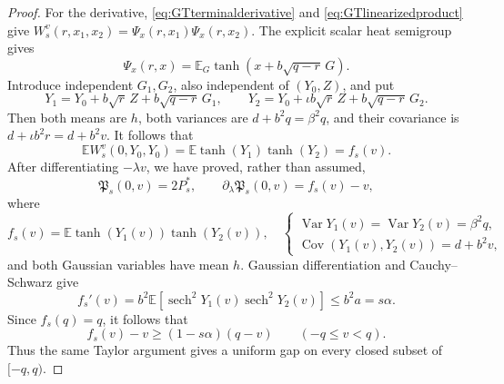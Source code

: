 \documentclass[11pt]{article}
\numberwithin{equation}{section}
\theoremstyle{plain}
\theoremstyle{definition}
\newcommand{\E}{\mathbb E}
\newcommand{\1}{\mathbf 1}
\newcommand{\sech}{\operatorname{sech}}
\begin{document}
\begin{proof}
For the derivative, \eqref{eq:GTterminalderivative} and
\eqref{eq:GTlinearizedproduct} give
$W_s^v(r,x_1,x_2)=\Psi_x(r,x_1)\Psi_x(r,x_2)$.  The explicit scalar
heat semigroup gives
\[
 \Psi_x(r,x)=\E_G\tanh(x+b\sqrt{q-r}\,G).
\]
Introduce independent $G_1,G_2$, also independent of $(Y_0,Z)$, and
put
\[
 Y_1=Y_0+b\sqrt r\,Z+b\sqrt{q-r}\,G_1,\qquad
 Y_2=Y_0+\iota b\sqrt r\,Z+b\sqrt{q-r}\,G_2.
\]
Then both means are $h$, both variances are $d+b^2q=\beta^2q$, and
their covariance is $d+\iota b^2r=d+b^2v$.  It follows that
\[
 \E W_s^v(0,Y_0,Y_0)=\E\tanh(Y_1)\tanh(Y_2)=f_s(v).
\]
After differentiating $-\lambda v$, we have proved, rather than
assumed,
\begin{equation}
 \mathfrak P_s(0,v)=2P_s^*,\qquad
 \partial_\lambda\mathfrak P_s(0,v)=f_s(v)-v,
 \label{eq:signedflat}
\end{equation}
where
\begin{equation}
 f_s(v)=\E\tanh(Y_1(v))\tanh(Y_2(v)),
 \quad
 \begin{cases}
 \operatorname{Var}Y_1(v)=\operatorname{Var}Y_2(v)=\beta^2q,\\
 \operatorname{Cov}(Y_1(v),Y_2(v))=d+b^2v,
 \end{cases}
 \label{eq:signedf}
\end{equation}
and both Gaussian variables have mean $h$.  Gaussian differentiation
and Cauchy--Schwarz give
\begin{equation}
 f_s'(v)=b^2\E[\sech^2Y_1(v)\sech^2Y_2(v)]
 \le b^2a=s\alpha.
 \label{eq:signedcontraction}
\end{equation}
Since $f_s(q)=q$, it follows that
\begin{equation}
 f_s(v)-v\ge(1-s\alpha)(q-v)
 \qquad(-q\le v<q).
 \label{eq:signedslope}
\end{equation}
Thus the same Taylor argument gives a uniform gap on every closed
subset of $[-q,q)$.


\end{proof}
\end{document}

